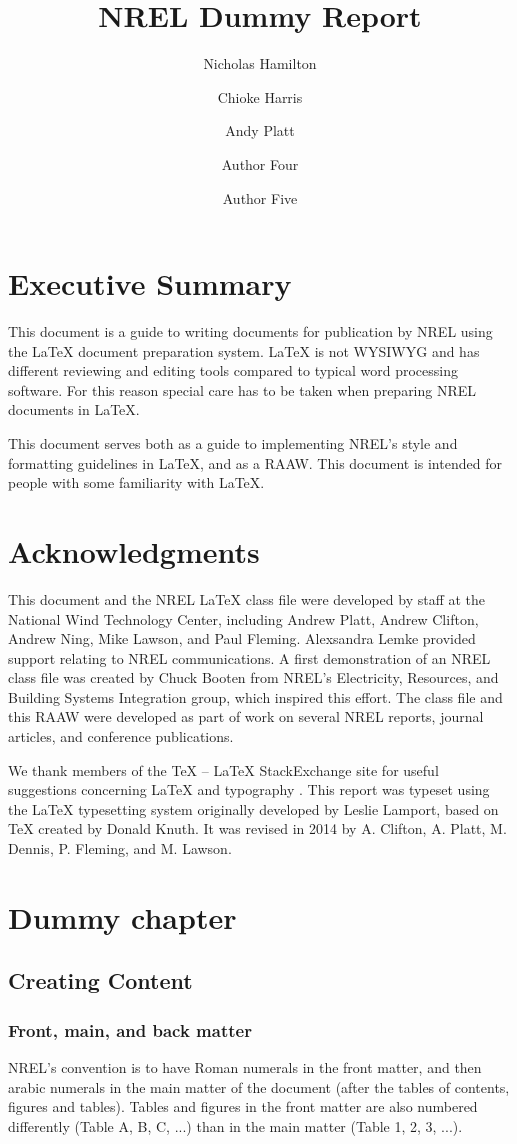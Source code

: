 \documentclass[]{nrel}
\title{NREL Dummy Report}
\author{Nicholas Hamilton}
\author{Chioke Harris}
\author{Andy Platt}
\affil{National Renewable Energy Laboratory}
\author{Author Four}
\affil{Another affiliation}
\author{Author Five}
\affil{A third affiliation}
\begin{document}
\frontmatter
\chapter{Executive Summary}
This document is a guide to writing documents for publication by NREL using the LaTeX document preparation system. LaTeX is not WYSIWYG and has different reviewing and editing tools compared to typical word processing software. For this reason special care has to be taken when preparing NREL documents in LaTeX. 

This document serves both as a guide to implementing NREL's style and formatting guidelines in LaTeX, and as a RAAW. This document is intended for people with some familiarity with LaTeX.

\chapter{Acknowledgments}
This document and the NREL LaTeX class file were developed by staff at the National Wind Technology Center, including Andrew Platt, Andrew Clifton, Andrew Ning, Mike Lawson, and Paul Fleming. Alexsandra Lemke provided support relating to NREL communications. A first demonstration of an NREL class file was created by Chuck Booten from NREL's Electricity, Resources, and Building Systems Integration group, which inspired this effort. The class file and this RAAW were developed as part of work on several NREL reports, journal articles, and conference publications. 

We thank members of the TeX -- LaTeX StackExchange site for useful suggestions concerning LaTeX and typography \citep{texstackexchange}.
This report was typeset using the LaTeX typesetting system originally developed by Leslie Lamport, based on TeX created by Donald Knuth. It was revised in 2014 by A. Clifton, A. Platt, M. Dennis, P. Fleming, and M. Lawson.


\mainmatter
\tableofcontents
\listoffigures
\listoftables


\chapter{Dummy chapter}
\section{Creating Content}
\subsection{Front, main, and back matter}
NREL's convention is to have Roman numerals in the front matter, and then arabic numerals in the main matter of the document (after the tables of contents, figures and tables). Tables and figures in the front matter are also numbered differently (Table A, B, C, ...) than in the main matter (Table 1, 2, 3, ...).
\end{document}
